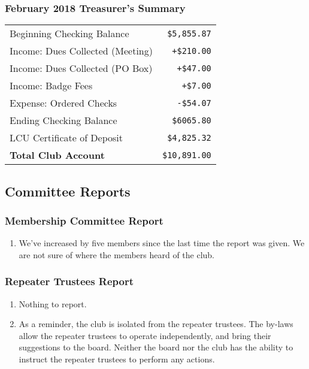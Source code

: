 \documentclass[10pt,letterpaper]{article}
\begin{document}
\subsubsection{February 2018 Treasurer's Summary}
\noindent
\begin{tabular}{|l|r|}
  \hline
  Beginning Checking Balance & \texttt{\$5,855.87} \\
  Income: Dues Collected (Meeting) & \texttt{+\$210.00} \\
  Income: Dues Collected (PO Box) & \texttt{+\$47.00} \\
  Income: Badge Fees & \texttt{+\$7.00} \\
  Expense: Ordered Checks & \texttt{-\$54.07} \\
  Ending Checking Balance & \texttt{\$6065.80} \\
  \hline
  \hline
  LCU Certificate of Deposit & \texttt{\$4,825.32} \\
  \hline
  \hline
  \textbf{Total Club Account} & \texttt{\$10,891.00} \\
  \hline
\end{tabular}

\subsection{Committee Reports}

\subsubsection{Membership Committee Report}
\begin{enumerate}
  \item We've increased by five members since the last time the report was given. We are not sure of where the members heard of the club.
\end{enumerate}

\subsubsection{Repeater Trustees Report}
\begin{enumerate}
  \item Nothing to report.
  \item As a reminder, the club is isolated from the repeater trustees. The by-laws allow the repeater trustees to operate independently, and bring their suggestions to the board. Neither the board nor the club has the ability to instruct the repeater trustees to perform any actions.
\end{enumerate}
\end{document}
